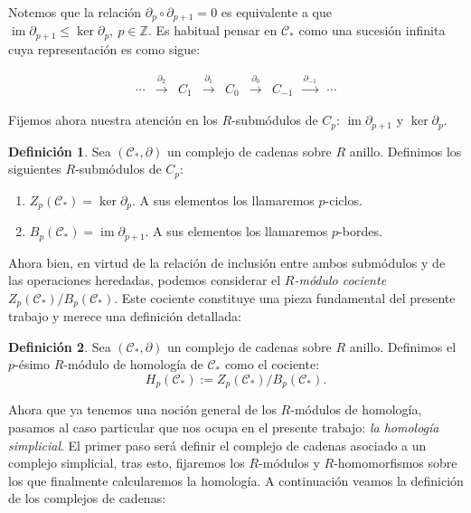 \documentclass[12pt, a4paper, twoside]{book}
\numberwithin{equation}{section}
\theoremstyle{definition}
\newtheorem{defi}{Definición}[section]
\theoremstyle{remark}
\theoremstyle{plain}
\DeclareMathOperator{\Ima}{im}
\begin{document}
	Notemos que la relación $\partial_{p}\circ \partial_{p+1}=0$ es 
	equivalente a que 
	$\Ima \partial_{p+1} \leq \ker \partial_{p},\ p \in \mathbb{Z}$. Es 
	habitual pensar en $\mathcal{C}_{*}$ como una sucesión infinita cuya
	representación es como sigue:

	\begin{equation*}
		 \left.
		\begin{array}{ccccccccc}
			\cdots & \overset{\partial_{2}}{\longrightarrow} & C_{1}& 
			\overset{\partial_{1}}{\longrightarrow} & C_{0} 
					& \overset{\partial_{0}}{\longrightarrow}
			& C_{-1} & 
			\overset{\partial_{-1}}{\longrightarrow} & \cdots 
		\end{array}
		\right. 
	\end{equation*}

	Fijemos ahora nuestra atención en los $R$-submódulos de $C_{p}$: 
	$\Ima \partial_{p+1}$ y $\ker \partial_{p}$.

	\begin{defi}
		Sea $(\mathcal{C}_{*},\partial)$ un complejo de cadenas sobre 
		$R$ anillo. 
		Definimos los siguientes $R$-submódulos de $C_{p}$:
		\begin{enumerate}
			\item $Z_{p}(\mathcal{C}_{*})=\ker \partial_{p}$. A 
				sus elementos los llamaremos $p$-ciclos.
			\item $B_{p}(\mathcal{C}_{*})=\Ima\partial_{p+1}$. A 
				sus elementos los llamaremos $p$-bordes.
		\end{enumerate}
	\end{defi}

	Ahora bien, en virtud de la relación de inclusión entre ambos 
	submódulos y de las operaciones heredadas, podemos considerar el 
	\emph{$R$-módulo cociente} $Z_{p}(\mathcal{C}_{*})/B_{p}(
	\mathcal{C}_{*})$. Este cociente constituye una pieza fundamental del 
	presente trabajo y merece una definición detallada:

	\begin{defi}
		Sea $(\mathcal{C}_{*},\partial)$ un complejo de cadenas sobre 
		$R$ anillo. Definimos el $p$-ésimo $R$-módulo de homología de
		$\mathcal{C}_{*}$ como el cociente:
		$$H_{p}(\mathcal{C}_{*}):=Z_{p}(\mathcal{C}_{*})/B_{p}(
		\mathcal{C}_{*}).$$
	\end{defi}

	Ahora que ya tenemos una noción general de los $R$-módulos de 
	homología, pasamos al caso particular que nos ocupa en el presente 
	trabajo: \emph{la homología simplicial}. El primer paso será definir 
	el complejo de cadenas asociado a un complejo simplicial, tras esto, 
	fijaremos los $R$-módulos y $R$-homomorfismos sobre los que 
	finalmente calcularemos la homología. A continuación veamos la 
	definición de los complejos de cadenas:
\end{document}
